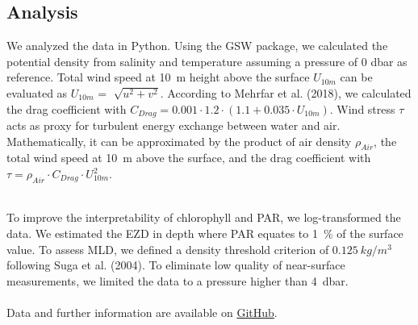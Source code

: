 \documentclass[../Main.tex]{subfiles}
\begin{document}
\subsection*{\crule[blue]{.2cm}{.2cm} Analysis}
We analyzed the data in Python. 
Using the GSW package, we calculated the potential density from salinity and temperature assuming a pressure of 0 dbar as reference\supercite{gsw}. 
Total wind speed at \SI{10}{m} height above the surface $U_{10m}$ can be evaluated as $U_{10m}$ = $\sqrt[]{u^2 + v^2}$. 
According to Mehrfar et al. (2018)\supercite{Mehrfar2018}, we calculated the drag coefficient with $C_{Drag} = 0.001\cdot1.2\cdot  (1.1+0.035\cdot U_{10m})$. 
Wind stress $\tau$ acts as proxy for turbulent energy exchange between water and air.
Mathematically, it can be approximated by the product of air density $\rho_{Air}$, the total wind speed at \SI{10}{m} above the surface, and the drag coefficient with $\tau = \rho_{Air}\cdot C_{Drag}\cdot U_{10m}^2$\supercite{Mehrfar2018}.

\\
To improve the interpretability of chlorophyll and PAR, we log-transformed the data.
We estimated the EZD in depth where PAR equates to \SI{1}{\%} of the surface value\supercite{Lee2007}.
To assess MLD, we defined a density threshold criterion of $\SI{0.125}{kg/m^3}$ following Suga et al. (2004)\supercite{Suga2004}. 
To eliminate low quality of near-surface measurements\supercite{Suga2004}, we limited the data to a pressure higher than \SI{4}{dbar}. 
\\
\\
Data and further information are available on \href{https://github.com/joaldi2208/BloomDynamics}{GitHub}.
\end{document}
